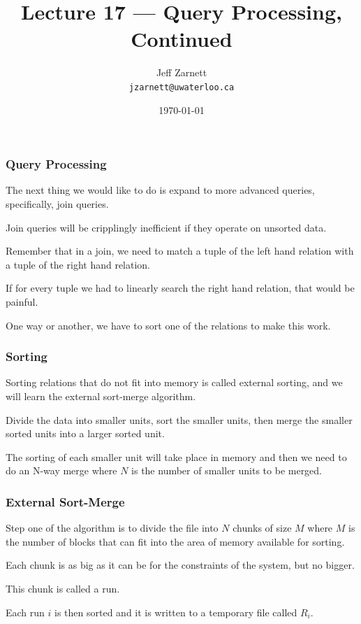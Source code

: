 

\title{Lecture 17 --- Query Processing, Continued }

\author{Jeff Zarnett \\ \small \texttt{jzarnett@uwaterloo.ca}}
\date{\today}




\begin{frame}
  \titlepage

 \end{frame}
 
 

\begin{frame}
\frametitle{Query Processing}

The next thing we would like to do is expand to more advanced queries, specifically, join queries. 

Join queries will be cripplingly inefficient if they operate on unsorted data. 

Remember that in a join, we need to match a tuple of the left hand relation with a tuple of the right hand relation. 

If for every tuple we had to linearly search the right hand relation, that would be painful. 

One way or another, we have to sort one of the relations to make this work.

\end{frame}


\begin{frame}
\frametitle{Sorting}

Sorting relations that do not fit into memory is called external sorting, and we will learn the external sort-merge algorithm. 

Divide the data into smaller units, sort the smaller units, then merge the smaller sorted units into a larger sorted unit. 

The sorting of each smaller unit will take place in memory and then we need to do an N-way merge where $N$ is the number of smaller units to be merged.


\end{frame}


\begin{frame}
\frametitle{External Sort-Merge}

Step one of the algorithm is to divide the file into $N$ chunks of size $M$ where $M$ is the number of blocks that can fit into the area of memory available for sorting.

Each chunk is as big as it can be for the constraints of the system, but no bigger.

This chunk is called a \alert{run}. 

Each run $i$ is then sorted and it is written to a temporary file called $R_{i}$.


\end{frame}

